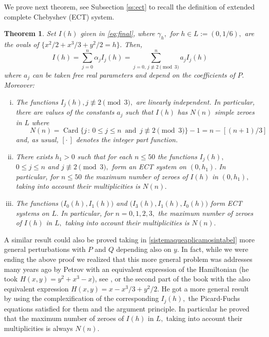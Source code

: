 \documentclass[12pt,a4paper,reqno]{amsart}
\newtheorem{teo}{Theorem}[section]
\begin{document}
We prove next theorem, see Subsection \ref{ss:ect} to recall the
definition of extended complete Chebyshev (ECT) system.

\begin{teo}\label{th:main2}   Set $I(h)$ given in \eqref{eq:final},
where $\gamma_h,$ for $h\in L:=(0,1/6),$ are the ovals of
$\{x^2/2+x^3/3+y^2/2=h\}.$ Then,
\[
I(h)=\sum_{j=0}^{n} \alpha_j I_{j}(h)=\sum_{j=0,\, j\not\equiv 2
\!\pmod 3}^{n} a_j I_{j}(h)
\]
where $a_j$ can be taken  free real parameters and depend on the
coefficients of $P.$ Moreover:
\begin{enumerate}[(i)]




\item The functions $I_j(h), j\not\equiv 2 \pmod 3,$ are linearly
independent. In particular,  there are values of the constants $a_j$
such that $I(h)$ has $N(n)$ simple zeroes in $L$ where
\[
\qquad N(n)=\operatorname{Card}\{j\,:\, 0\le j\le n\, \mbox{ and }\,
j\not\equiv 2 \pmod 3\}-1=n-[(n+1)/3]
\]
and, as usual, $[\cdot\,]$ denotes the integer part function.

\item  There exists  $h_1>0$ such that for each $n\le 50$ the functions $I_j(h),$ $0\le j\le n$ and  $j\not\equiv 2 \pmod
3,$ form an ECT system  on $(0,h_1).$ In particular, for $n\le50$
the maximum number of zeroes of $I(h)$ in $(0,h_1),$ taking into
account their multiplicities is $N(n).$


\item The functions $\big(I_0(h), I_1(h)\big)$ and $\big(I_3(h), I_1(h), I_0(h)\big)$ form
 ECT systems on $L.$ In particular, for $n=0,1,2,3,$ the maximum
number of zeroes of $I(h)$ in $L,$ taking into account their
multiplicities is $N(n).$



\end{enumerate}
\end{teo}

A similar result could also be proved taking in
\eqref{sistemaqueaplicamosintabel} more general perturbations with
$P$ and $Q$ depending also on $y.$ In fact, while we were ending the
above proof we realized that this more general  problem was
addresses many years ago by Petrov with an equivalent expression of
the Hamiltonian (he took $H(x,y)=y^2+x^3-x$), see \cite{Petrov1988},
or the second part of the book \cite{ChrLi2007} with the also
equivalent expression $H(x,y)=x-x^3/3+y^2/2.$ He got a more general
result by using the complexification of the corresponding $I_j(h),$
the Picard-Fuchs equations satisfied for them and the argument
principle. In particular he proved that the maximum number of zeroes
of $I(h)$ in $L,$ taking into account their multiplicities is always
$N(n).$
\end{document}
